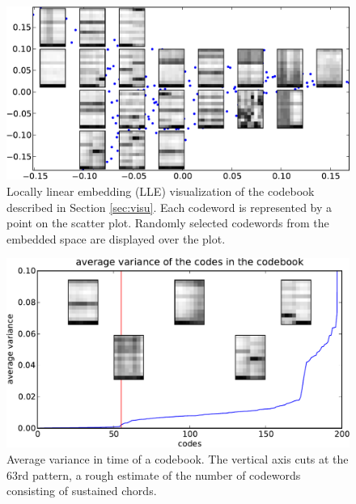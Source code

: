 \documentclass{article}
\begin{document}
\begin{figure}[t]
\begin{center}
\includegraphics[width=.9\columnwidth]{codes_lle}
\end{center}
\caption{\small{ Locally linear embedding (LLE) visualization of the
    codebook described in Section \ref{sec:visu}.  Each codeword is
    represented by a point on the scatter plot.  Randomly selected
    codewords from the embedded space are displayed over the plot.
  }}
\label{fig:lle}
\end{figure}

\begin{figure}[t]
\begin{center}
\includegraphics[width=.9\columnwidth]{code_variance}
\end{center}
\caption{\small{Average variance in time of a codebook. The vertical
axis cuts at the $63$rd pattern, a rough estimate of the number of 
codewords consisting of sustained chords.
}}
\label{fig:code_var}
\end{figure}
\end{document}
